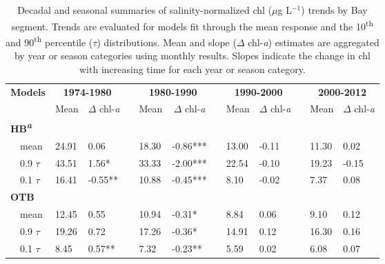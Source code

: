 \documentclass{svjour3}\usepackage[]{graphicx}\usepackage[]{color}
\newcommand{\mugl}{$\mu$g L$^{-1}$}
\begin{document}
%
\begin{table}[!tbp]
\caption{Decadal and seasonal summaries of salinity-normalized \ac{chl} (\mugl) trends by Bay segment. Trends are evaluated for models fit through the mean response and the 10\textsuperscript{th} and 90\textsuperscript{th} percentile ($\tau$) distributions.  Mean and slope ($\Delta$ chl-\textit{a}) estimates are aggregated by year or season categories using monthly results.  Slopes indicate the change in \ac{chl} with increasing time for each year or season category.\label{tab:trendsal}} 
\begin{center}
\begin{tabular}{lllcllcllcll}
\hline\hline
\multicolumn{1}{l}{\bfseries Models}&\multicolumn{2}{c}{\bfseries {\bf 1974-1980}}&\multicolumn{1}{c}{\bfseries }&\multicolumn{2}{c}{\bfseries {\bf 1980-1990}}&\multicolumn{1}{c}{\bfseries }&\multicolumn{2}{c}{\bfseries {\bf 1990-2000}}&\multicolumn{1}{c}{\bfseries }&\multicolumn{2}{c}{\bfseries {\bf 2000-2012}}\tabularnewline
\cline{2-3} \cline{5-6} \cline{8-9} \cline{11-12}
\multicolumn{1}{l}{}&\multicolumn{1}{c}{Mean}&\multicolumn{1}{c}{$\Delta$ chl-\textit{a}}&\multicolumn{1}{c}{}&\multicolumn{1}{c}{Mean}&\multicolumn{1}{c}{$\Delta$ chl-\textit{a}}&\multicolumn{1}{c}{}&\multicolumn{1}{c}{Mean}&\multicolumn{1}{c}{$\Delta$ chl-\textit{a}}&\multicolumn{1}{c}{}&\multicolumn{1}{c}{Mean}&\multicolumn{1}{c}{$\Delta$ chl-\textit{a}}\tabularnewline
\hline
{\bfseries HB\textsuperscript{\textit{a}}}&&&&&&&&&&&\tabularnewline
~~mean&24.91& 0.06 &&18.30&-0.86***&&13.00&-0.11 &&11.30& 0.02 \tabularnewline
~~0.9 $\tau$&43.51& 1.56*&&33.33&-2.00***&&22.54&-0.10 &&19.23&-0.15 \tabularnewline
~~0.1 $\tau$&16.41&-0.55**&&10.88&-0.45***&& 8.10&-0.02 && 7.37& 0.08 \tabularnewline
\hline
{\bfseries OTB}&&&&&&&&&&&\tabularnewline
~~mean&12.45& 0.55 &&10.94&-0.31*&& 8.84& 0.06 && 9.10& 0.12 \tabularnewline
~~0.9 $\tau$&19.26& 0.72 &&17.26&-0.36*&&14.91& 0.12 &&16.30& 0.16 \tabularnewline
~~0.1 $\tau$& 8.45& 0.57**&& 7.32&-0.23**&& 5.59& 0.02 && 6.08& 0.07 \tabularnewline

\end{tabular}
\end{center}
\end{table}
\end{document}
